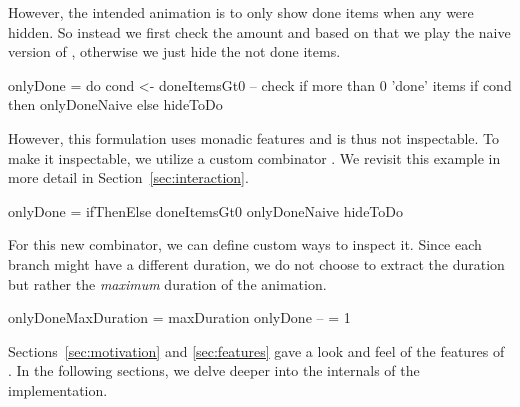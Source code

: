 However, the intended animation is to only show done items when any were hidden.
So instead we first check the amount and based on that we play the naive version of ,
otherwise we just hide the not done items.

\begin{spec}
onlyDone = do
  cond <- doneItemsGt0    -- check if more than 0 'done' items
  if cond then onlyDoneNaive else hideToDo
\end{spec}

However, this formulation uses monadic features and is thus not inspectable.
To make it inspectable, we utilize a custom combinator .
We revisit this example in more detail in Section~\ref{sec:interaction}.

\begin{spec}
onlyDone = ifThenElse doneItemsGt0 onlyDoneNaive hideToDo
\end{spec}

For this new combinator, we can define custom ways to inspect it. Since each
branch might have a different duration, we do not choose to extract the
duration but rather the \emph{maximum} duration of the animation.

\begin{spec}
onlyDoneMaxDuration = maxDuration onlyDone -- = 1
\end{spec}

Sections~\ref{sec:motivation} and \ref{sec:features} gave a look and feel of the
features of \dsl{}. In the following sections, we delve deeper into the
internals of the implementation.
